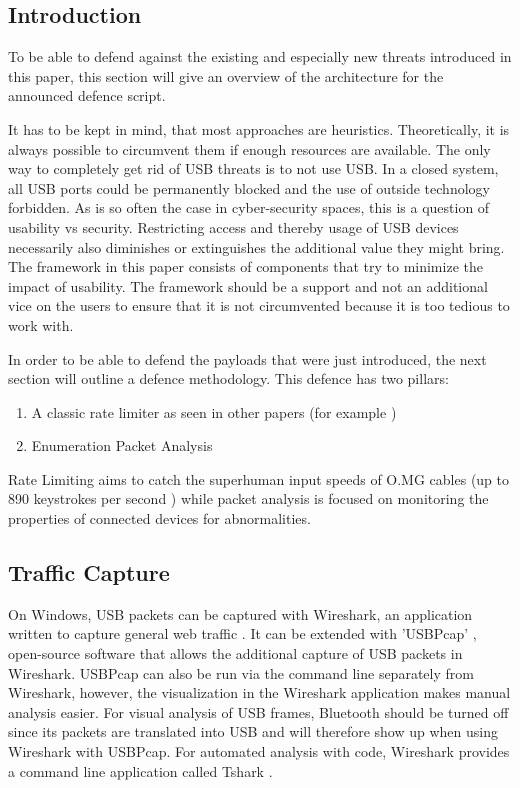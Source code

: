 \subsection{Introduction}

To be able to defend against the existing and especially new threats introduced in this paper, this section will give an overview of the architecture for the announced defence script.

It has to be kept in mind, that most approaches are heuristics. Theoretically, it is always possible to circumvent them if enough resources are available. The only way to completely get rid of USB threats is to not use USB. In a closed system, all USB ports could be permanently blocked and the use of outside technology forbidden. As is so often the case in cyber-security spaces, this is a question of usability vs security. Restricting access and thereby usage of USB devices necessarily also diminishes or extinguishes the additional value they might bring. The framework in this paper consists of components that try to minimize the impact of usability. The framework should be a support and not an additional vice on the users to ensure that it is not circumvented because it is too tedious to work with.  

In order to be able to defend the payloads that were just introduced, the next section will outline a defence methodology.
This defence has two pillars:
\begin{enumerate}
    \item A classic rate limiter as seen in other papers (for example \cite{neunerUSBlockBlockingUSBBased2018} )
    \item Enumeration Packet Analysis
\end{enumerate}

Rate Limiting aims to catch the superhuman input speeds of O.MG cables (up to 890 keystrokes per second \cite{hak5MGCable}) while packet analysis is focused on monitoring the properties of connected devices for abnormalities.


\subsection{Traffic Capture} \label{Traffic Capture}

On Windows, USB packets can be captured with Wireshark, an application written to capture general web traffic \cite{WiresharkGoDeep}. It can be extended with 'USBPcap' \cite{USBPcap}, open-source software that allows the additional capture of USB packets in Wireshark. USBPcap can also be run via the command line separately from Wireshark, however, the visualization in the Wireshark application makes manual analysis easier. For visual analysis of USB frames, Bluetooth should be turned off since its packets are translated into USB and will therefore show up when using Wireshark with USBPcap. For automated analysis with code, Wireshark provides a command line application called Tshark \cite{TsharkTsharkDev}. 

